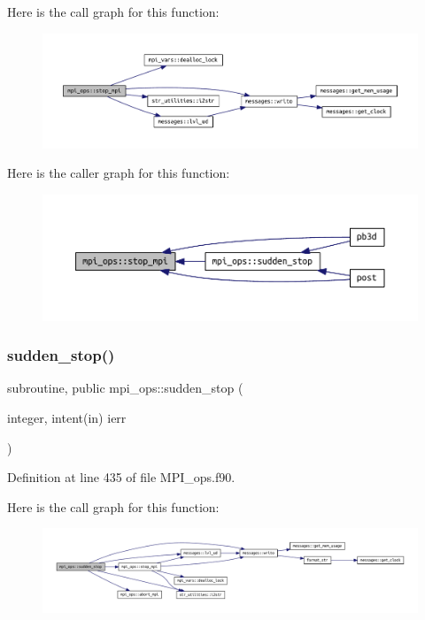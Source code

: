 Here is the call graph for this function\+:
\nopagebreak
\begin{figure}[H]
\begin{center}
\leavevmode
\includegraphics[width=350pt]{namespacempi__ops_abaf1ff6b3a25463476a767e196b4a73c_cgraph}
\end{center}
\end{figure}
Here is the caller graph for this function\+:
\nopagebreak
\begin{figure}[H]
\begin{center}
\leavevmode
\includegraphics[width=350pt]{namespacempi__ops_abaf1ff6b3a25463476a767e196b4a73c_icgraph}
\end{center}
\end{figure}
\mbox{\label{namespacempi__ops_a40e8610357a9a5b075fef9dab1c3f24f}} 
\subsubsection{\texorpdfstring{sudden\+\_\+stop()}{sudden\_stop()}}
{\footnotesize\ttfamily subroutine, public mpi\+\_\+ops\+::sudden\+\_\+stop (\begin{DoxyParamCaption}\item[{integer, intent(in)}]{ierr }\end{DoxyParamCaption})}



Definition at line 435 of file M\+P\+I\+\_\+ops.\+f90.

Here is the call graph for this function\+:
\nopagebreak
\begin{figure}[H]
\begin{center}
\leavevmode
\includegraphics[width=350pt]{namespacempi__ops_a40e8610357a9a5b075fef9dab1c3f24f_cgraph}
\end{center}
\end{figure}
